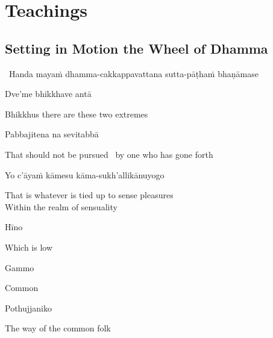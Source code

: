 \ifdesktopversion
{}
\else
{}
\fi

\chapter{Teachings}

\section{Setting in Motion the Wheel of Dhamma}
\label{wheel-of-dhamma-abridged}

\begin{leader}
  \anglebracketleft\ \hspace{-0.5mm}Handa mayaṁ dhamma-cakkappavattana sutta-pāṭhaṁ bhaṇāmase \hspace{-0.5mm}\anglebracketright\
\end{leader}

Dve'me bhikkhave antā

\begin{english}
  Bhikkhus there are these two extremes
\end{english}

Pabbajitena na sevitabbā

\begin{english}
  That should not be pursued \breathmark\ by one who has gone forth
\end{english}

Yo c'āyaṁ kāmesu kāma-sukh'allikānuyogo

\begin{english}
  That is whatever is tied up to sense pleasures\\
  Within the realm of sensuality
\end{english}

Hīno

\begin{english}
  Which is low
\end{english}

Gammo

\begin{english}
  Common
\end{english}

Pothujjaniko

\begin{english}
  The way of the common folk
\end{english}

